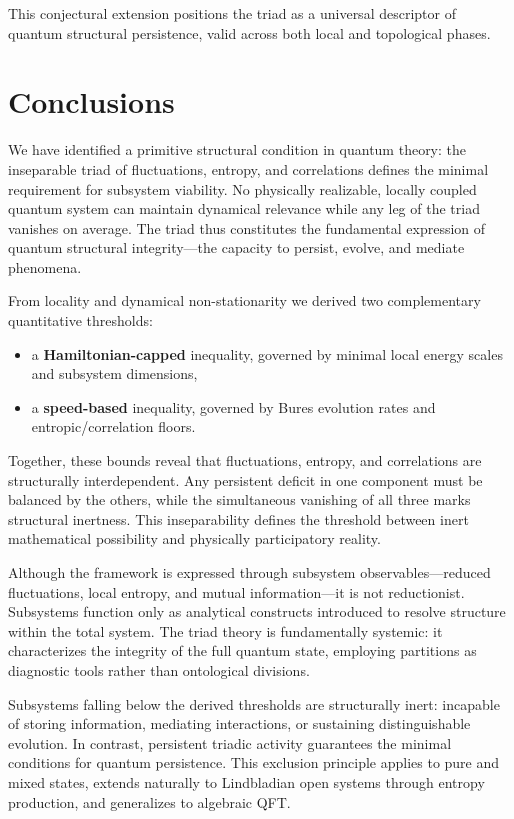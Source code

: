 \documentclass[10pt]{article}
\begin{document}
This conjectural extension positions the triad as a universal descriptor of quantum structural 
persistence, valid across both local and topological phases.



\section{Conclusions}

We have identified a primitive structural condition in quantum theory: the inseparable triad of fluctuations, entropy, and correlations defines the minimal requirement for subsystem viability. No physically realizable, locally coupled quantum system can maintain dynamical relevance while any leg of the triad vanishes on average. The triad thus constitutes the fundamental expression of quantum structural integrity—the capacity to persist, evolve, and mediate phenomena.

From locality and dynamical non-stationarity we derived two complementary quantitative thresholds:
\begin{itemize}
    \item a \textbf{Hamiltonian-capped} inequality, governed by minimal local energy scales and subsystem dimensions,
    \item a \textbf{speed-based} inequality, governed by Bures evolution rates and entropic/correlation floors.
\end{itemize}
Together, these bounds reveal that fluctuations, entropy, and correlations are structurally interdependent. Any persistent deficit in one component must be balanced by the others, while the simultaneous vanishing of all three marks structural inertness. This inseparability defines the threshold between inert mathematical possibility and physically participatory reality.

Although the framework is expressed through subsystem observables—reduced fluctuations, local entropy, and mutual information—it is not reductionist. Subsystems function only as analytical constructs introduced to resolve structure within the total system. The triad theory is fundamentally systemic: it characterizes the integrity of the full quantum state, employing partitions as diagnostic tools rather than ontological divisions.

Subsystems falling below the derived thresholds are structurally inert: incapable of storing information, mediating interactions, or sustaining distinguishable evolution. In contrast, persistent triadic activity guarantees the minimal conditions for quantum persistence. This exclusion principle applies to pure and mixed states, extends naturally to Lindbladian open systems through entropy production, and generalizes to algebraic QFT.
\end{document}
